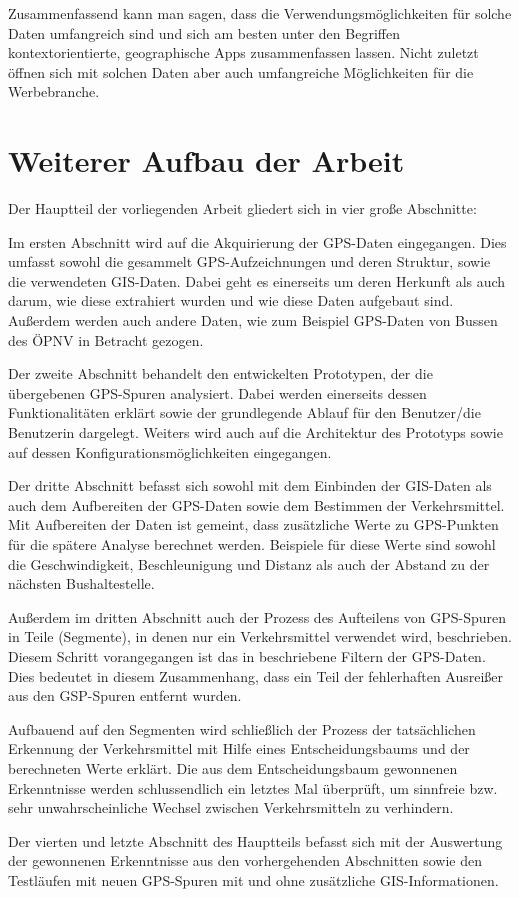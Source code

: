 Zusammenfassend kann man sagen, dass die Verwendungsmöglichkeiten für solche Daten umfangreich sind und sich am besten unter den Begriffen kontextorientierte, geographische Apps zusammenfassen lassen. Nicht zuletzt öffnen sich mit solchen Daten aber auch umfangreiche Möglichkeiten für die Werbebranche.

\section{Weiterer Aufbau der Arbeit}
Der Hauptteil der vorliegenden Arbeit gliedert sich in vier große Abschnitte:

Im ersten Abschnitt wird auf die Akquirierung der GPS-Daten eingegangen. Dies umfasst sowohl die gesammelt GPS-Aufzeichnungen und deren Struktur, sowie die verwendeten GIS-Daten. Dabei geht es einerseits um deren Herkunft als auch darum, wie diese extrahiert wurden und wie diese Daten aufgebaut sind. Außerdem werden auch andere Daten, wie zum Beispiel GPS-Daten von Bussen des ÖPNV in Betracht gezogen.

Der zweite Abschnitt behandelt den entwickelten Prototypen, der die übergebenen GPS-Spuren analysiert. Dabei werden einerseits dessen Funktionalitäten erklärt sowie der grundlegende Ablauf für den Benutzer/die Benutzerin dargelegt. Weiters wird auch auf die Architektur des Prototyps sowie auf dessen Konfigurationsmöglichkeiten eingegangen.

Der dritte Abschnitt befasst sich sowohl mit dem Einbinden der GIS-Daten als auch dem Aufbereiten der GPS-Daten sowie dem Bestimmen der Verkehrsmittel. Mit Aufbereiten der Daten ist gemeint, dass zusätzliche Werte zu GPS-Punkten für die spätere Analyse berechnet werden. Beispiele für diese Werte sind sowohl die Geschwindigkeit, Beschleunigung und Distanz als auch der Abstand zu der nächsten Bushaltestelle. 

Außerdem im dritten Abschnitt auch der Prozess des Aufteilens von GPS-Spuren in Teile (Segmente), in denen nur ein Verkehrsmittel verwendet wird, beschrieben. Diesem Schritt vorangegangen ist das in  beschriebene Filtern der GPS-Daten. Dies bedeutet in diesem Zusammenhang, dass ein Teil der fehlerhaften Ausreißer aus den GSP-Spuren entfernt wurden.

Aufbauend auf den Segmenten wird schließlich der Prozess der tatsächlichen Erkennung der Verkehrsmittel mit Hilfe eines Entscheidungsbaums und der berechneten Werte erklärt. Die aus dem Entscheidungsbaum gewonnenen Erkenntnisse werden schlussendlich ein letztes Mal überprüft, um sinnfreie bzw. sehr unwahrscheinliche Wechsel zwischen Verkehrsmitteln zu verhindern. 

Der vierten und letzte Abschnitt des Hauptteils befasst sich mit der Auswertung der gewonnenen Erkenntnisse aus den vorhergehenden Abschnitten sowie den Testläufen mit neuen GPS-Spuren mit und ohne zusätzliche GIS-Informationen.
